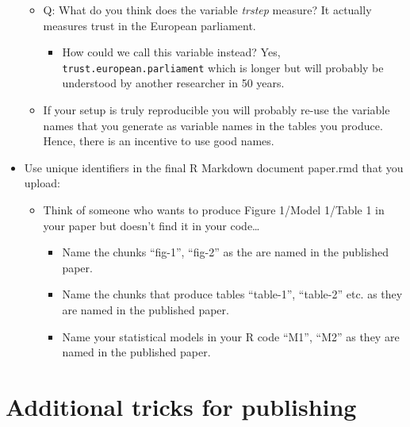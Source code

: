 \documentclass[
  letterpaper,
  DIV=11,
  numbers=noendperiod]{scrartcl}
\providecommand{\tightlist}{%
  \setlength{\itemsep}{0pt}\setlength{\parskip}{0pt}}\usepackage{longtable,booktabs,array}
\begin{document}
\begin{itemize}
  \begin{itemize}
  \tightlist
  \item
    Q: What do you think does the variable \emph{trstep} measure? It
    actually measures trust in the European parliament.

    \begin{itemize}
    \tightlist
    \item
      How could we call this variable instead? Yes,
      \texttt{trust.european.parliament} which is longer but will
      probably be understood by another researcher in 50 years.
    \end{itemize}
  \item
    If your setup is truly reproducible you will probably re-use the
    variable names that you generate as variable names in the tables you
    produce. Hence, there is an incentive to use good names.
  \end{itemize}
\item
  Use unique identifiers in the final R Markdown document paper.rmd that
  you upload:

  \begin{itemize}
  \tightlist
  \item
    Think of someone who wants to produce Figure 1/Model 1/Table 1 in
    your paper but doesn't find it in your code\ldots{}

    \begin{itemize}
    \tightlist
    \item
      Name the chunks ``fig-1'', ``fig-2'' as the are named in the
      published paper.
    \item
      Name the chunks that produce tables ``table-1'', ``table-2'' etc.
      as they are named in the published paper.
    \item
      Name your statistical models in your R code ``M1'', ``M2'' as they
      are named in the published paper.
    \end{itemize}
  \end{itemize}
\end{itemize}

\hypertarget{additional-tricks-for-publishing}{%
\section{Additional tricks for
publishing}\label{additional-tricks-for-publishing}}
\end{document}

